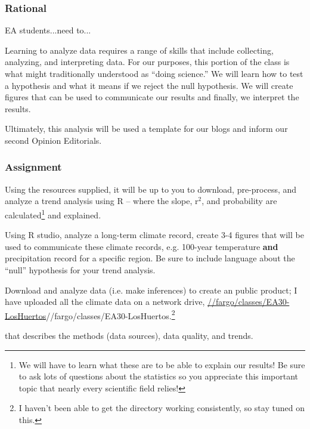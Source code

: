 
\subsubsection{Rational}

EA students...need to...

Learning to analyze data requires a range of skills that include collecting, analyzing, and interpreting data. For our purposes, this portion of the class is what might traditionally understood as ``doing science.'' We will learn how to test a hypothesis and what it means if we reject the null hypothesis. We will create figures that can be used to communicate our results and finally, we interpret the results. 

Ultimately, this analysis will be used a template for our blogs and inform our second Opinion Editorials. 

\subsubsection{Assignment}

Using the resources supplied, it will be up to you to download, pre-process, and analyze a trend analysis using R -- where the slope, r$^2$, and probability are calculated\footnote{We will have to learn what these are to be able to explain our results! Be sure to ask lots of questions about the statistics so you appreciate this important topic that nearly every scientific field relies!} and explained. 

Using R studio, analyze a long-term climate record, create 3-4 figures that will be used to communicate these climate records, e.g. 100-year temperature \textbf{and} precipitation record for a specific region. Be sure to include language about the ``null'' hypothesis for your trend analysis.

\begin{enumerate*}
  \item Download and analyze data (i.e. make inferences) to create an public product; I have uploaded all the climate data on a network drive, \url{//fargo/classes/EA30-LosHuertos}{//fargo/classes/EA30-LosHuertos}.\footnote{I haven't been able to get the directory working consistently, so stay tuned on this.}
  
\end{enumerate*}
 that describes the methods (data sources), data quality, and trends. 


